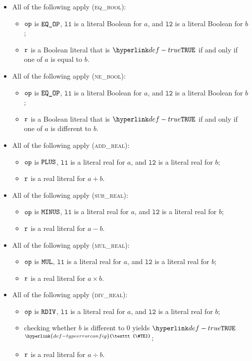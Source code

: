 \documentclass{book}
\newcommand\TypeErrorConfig[0]{\hyperlink{def-typeerrorconfig}{\texttt{\#TE}}}
\newcommand\ProseOrTypeError[0]{\hyperlink{def-proseortypeerror}{$^{\TypeErrorConfig}$}}
\newcommand\vlone[0]{\texttt{l1}}
\newcommand\vltwo[0]{\texttt{l2}}
\begin{document}
\begin{itemize}
  \item All of the following apply (\textsc{eq\_bool}):
  \begin{itemize}
    \item $\texttt{op}$ is $\texttt{EQ\_OP}$, $\vlone$ is a literal Boolean for $a$, and $\vltwo$ is a literal Boolean for $b$;
    \item $\texttt{r}$ is a Boolean literal that is $\True$ if and only if one of $a$ is equal to $b$.
  \end{itemize}

  \item All of the following apply (\textsc{ne\_bool}):
  \begin{itemize}
    \item $\texttt{op}$ is $\texttt{EQ\_OP}$, $\vlone$ is a literal Boolean for $a$, and $\vltwo$ is a literal Boolean for $b$;
    \item $\texttt{r}$ is a Boolean literal that is $\True$ if and only if one of $a$ is different to $b$.
  \end{itemize}

  \item All of the following apply (\textsc{add\_real}):
  \begin{itemize}
    \item $\texttt{op}$ is $\texttt{PLUS}$, $\vlone$ is a literal real for $a$, and $\vltwo$ is a literal real for $b$;
    \item $\texttt{r}$ is a real literal for $a + b$.
  \end{itemize}

  \item All of the following apply (\textsc{sub\_real}):
  \begin{itemize}
    \item $\texttt{op}$ is $\texttt{MINUS}$, $\vlone$ is a literal real for $a$, and $\vltwo$ is a literal real for $b$;
    \item $\texttt{r}$ is a real literal for $a - b$.
  \end{itemize}

  \item All of the following apply (\textsc{mul\_real}):
  \begin{itemize}
    \item $\texttt{op}$ is $\texttt{MUL}$, $\vlone$ is a literal real for $a$, and $\vltwo$ is a literal real for $b$;
    \item $\texttt{r}$ is a real literal for $a \times b$.
  \end{itemize}

  \item All of the following apply (\textsc{div\_real}):
  \begin{itemize}
    \item $\texttt{op}$ is $\texttt{RDIV}$, $\vlone$ is a literal real for $a$, and $\vltwo$ is a literal real for $b$;
    \item checking whether $b$ is different to $0$ yields $\True$ \ProseOrTypeError;
    \item $\texttt{r}$ is a real literal for $a \div b$.
  \end{itemize}


\end{itemize}
\end{document}
